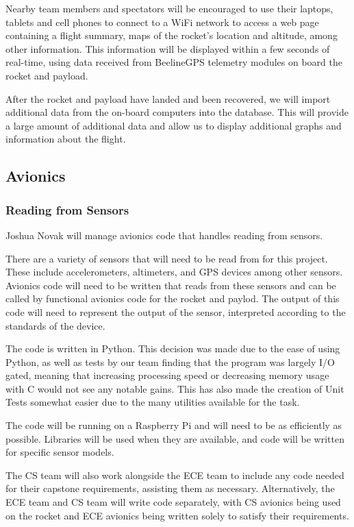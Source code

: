\documentclass[onecolumn, draftclsnofoot, 10pt, compsoc]{IEEEtran}
\begin{document}
Nearby team members and spectators will be encouraged to use their laptops, tablets and cell phones to connect to a WiFi network to access a web page containing a flight summary, maps of the rocket's location and altitude, among other information.  This information will be displayed within a few seconds of real-time, using data received from BeelineGPS telemetry modules on board the rocket and payload.

After the rocket and payload have landed and been recovered, we will import additional data from the on-board computers into the database.  This will provide a large amount of additional data and allow us to display additional graphs and information about the flight.

\subsection{Avionics}

\subsubsection{Reading from Sensors}

Joshua Novak will manage avionics code that handles reading from sensors.

There are a variety of sensors that will need to be read from for this project. These include accelerometers, altimeters, and GPS devices among other sensors. Avionics code will need to be written that reads from these sensors and can be called by functional avionics code for the rocket and paylod. The output of this code will need to represent the output of the sensor, interpreted according to the standards of the device. 

The code is written in Python. This decision was made due to the ease of using Python, as well as tests by our team finding that the program was largely I/O gated, meaning that increasing processing speed or decreasing memory usage with C would not see any notable gains. This has also made the creation of Unit Tests somewhat easier due to the many utilities available for the task.

The code will be running on a Raspberry Pi and will need to be as efficiently as possible. Libraries will be used when they are available, and code will be written for specific sensor models.

The CS team will also work alongside the ECE team to include any code needed for their capstone requirements, assisting them as necessary. Alternatively, the ECE team and CS team will write code separately, with CS avionics being used on the rocket and ECE avionics being written solely to satisfy their requirements.
\end{document}
